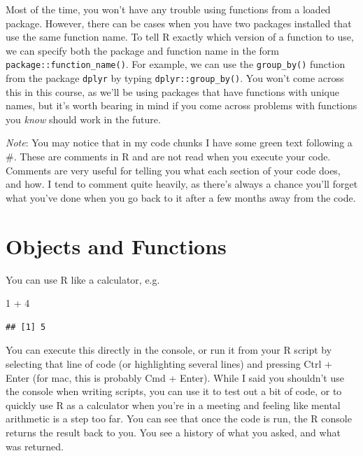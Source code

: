 \documentclass[
]{book}
\newenvironment{Shaded}{\begin{snugshade}}{\end{snugshade}}
\newcommand{\DecValTok}[1]{\textcolor[rgb]{0.00,0.00,0.81}{#1}}
\newcommand{\SpecialCharTok}[1]{\textcolor[rgb]{0.00,0.00,0.00}{#1}}
\begin{document}
Most of the time, you won't have any trouble using functions from a loaded package. However, there can be cases when you have two packages installed that use the same function name. To tell R exactly which version of a function to use, we can specify both the package and function name in the form \texttt{package::function\_name()}. For example, we can use the \texttt{group\_by()} function from the package \texttt{dplyr} by typing \texttt{dplyr::group\_by()}. You won't come across this in this course, as we'll be using packages that have functions with unique names, but it's worth bearing in mind if you come across problems with functions you \emph{know} should work in the future.

\emph{Note}: You may notice that in my code chunks I have some green text following a \#. These are comments in R and are not read when you execute your code. Comments are very useful for telling you what each section of your code does, and how. I tend to comment quite heavily, as there's always a chance you'll forget what you've done when you go back to it after a few months away from the code.

\hypertarget{objects-and-functions}{%
\section{Objects and Functions}\label{objects-and-functions}}

You can use R like a calculator, e.g.

\begin{Shaded}
\begin{Highlighting}[]
\DecValTok{1} \SpecialCharTok{+} \DecValTok{4}
\end{Highlighting}
\end{Shaded}

\begin{verbatim}
## [1] 5
\end{verbatim}

You can execute this directly in the console, or run it from your R script by selecting that line of code (or highlighting several lines) and pressing Ctrl + Enter (for mac, this is probably Cmd + Enter). While I said you shouldn't use the console when writing scripts, you can use it to test out a bit of code, or to quickly use R as a calculator when you're in a meeting and feeling like mental arithmetic is a step too far. You can see that once the code is run, the R console returns the result back to you. You see a history of what you asked, and what was returned.
\end{document}
